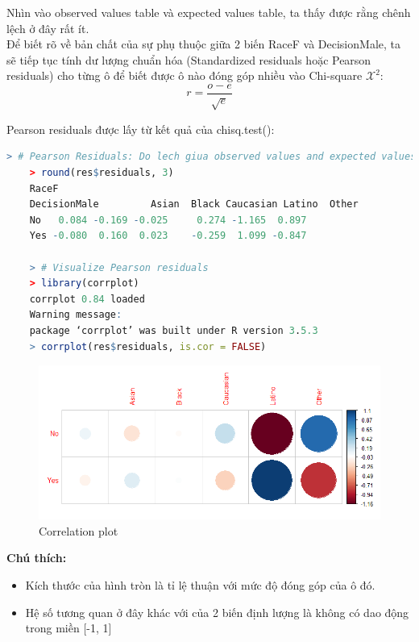 \documentclass[a4paper,12pt]{article}
\begin{document}
	Nhìn vào observed values table và expected values table, ta thấy được rằng chênh lệch ở đây rất ít.\\
	
	Để biết rõ về bản chất của sự phụ thuộc giữa 2 biến RaceF và DecisionMale, ta sẽ tiếp tục tính dư lượng chuẩn hóa (Standardized residuals hoặc Pearson residuals) cho từng ô để biết được ô nào đóng góp nhiều vào Chi-square $\mathcal{X}^2$:
	$$r = \frac{{o - e}}{\sqrt{e}}$$
	
	Pearson residuals được lấy từ kết quả của chisq.test():
	\begin{lstlisting}[language=R]
	> # Pearson Residuals: Do lech giua observed values and expected values
	> round(res$residuals, 3)
	RaceF
	DecisionMale         Asian  Black Caucasian Latino  Other
	No   0.084 -0.169 -0.025     0.274 -1.165  0.897
	Yes -0.080  0.160  0.023    -0.259  1.099 -0.847
	
	> # Visualize Pearson residuals
	> library(corrplot)
	corrplot 0.84 loaded
	Warning message:
	package ‘corrplot’ was built under R version 3.5.3 
	> corrplot(res$residuals, is.cor = FALSE)
	\end{lstlisting}
	
	\begin{figure}[H]
		\centering
		\includegraphics[width=0.7\linewidth]{corplot}
		\caption{Correlation plot}
		\label{fig:corplot}
	\end{figure}
	
	\textbf{Chú thích:}
	\begin{itemize}
		\item Kích thước của hình tròn là tỉ lệ thuận với mức độ đóng góp của ô đó.
		\item Hệ số tương quan ở đây khác với của 2 biến định lượng là không có dao động trong miền [-1, 1]	
	\end{itemize}
	
\end{document}

